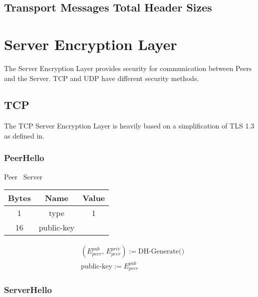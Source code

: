 \documentclass{article}
\begin{document}
    \subsection{Transport Messages Total Header Sizes}



    \section{Server Encryption Layer}

    The Server Encryption Layer provides security for communication between Peers and the Server. TCP and UDP have
    different security methods.

    \subsection{TCP}

    The TCP Server Encryption Layer is heavily based on a simplification of TLS 1.3 as defined in. %

    \subsubsection{PeerHello}

    \begin{center}
        Peer \textrightarrow\ Server\\
        \begin{tabular}{|c|c|c|}
            \hline
            \textbf{Bytes} & \textbf{Name} & \textbf{Value} \\
            \hline
            1              & type          & 1              \\
            \hline
            16             & public-key    &                \\
            \hline
        \end{tabular}
    \end{center}

    \begin{align*}
        &(E_{peer}^{pub},\,E_{peer}^{priv}) := \text{DH-Generate()}\\
        &\text{public-key} := E_{peer}^{pub}
    \end{align*}

    \subsubsection{ServerHello}
\end{document}
